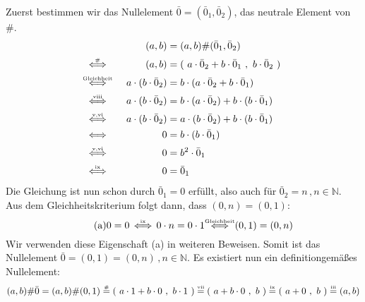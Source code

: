 \documentclass[a4paper,graphics,12pt]{article}
\newcommand{\up}[2]{\mathrel{\overset{\makebox[0pt]{\mbox{\normalfont\tiny #2}}}{#1}}}
\newcommand{\pair}[2]{(\ #1\ ,\ #2\ )}
\begin{document}
    Zuerst bestimmen wir das Nullelement $\bar{0} = (\bar{0}_1,\bar{0}_2)$, das neutrale Element von $\#$.
    \begin{alignat*}{3}
        &                                       & (a,b)
            &= (a,b) \# (\bar{0}_1,\bar{0}_2) \\[1pt]
        &\up{\Longleftrightarrow}{\#}\quad      & (a,b)
            &= \pair{a\cdot \bar{0}_2 + b\cdot \bar{0}_1}{b\cdot \bar{0}_2} \\[1pt]
        &\up{\Longleftrightarrow}{Gleichheit}   & a \cdot (b\cdot \bar{0}_2)
            &= b\cdot (a\cdot \bar{0}_2 + b\cdot \bar{0}_1) \\[1pt]
        &\up{\Longleftrightarrow}{viii}         & a\cdot (b\cdot \bar{0}_2)
            &= b\cdot (a\cdot \bar{0}_2) + b\cdot (b\cdot \bar{0}_1) \\[1pt]
        &\up{\Longleftrightarrow}{v,vi}         & a \cdot (b\cdot \bar{0}_2)
            &= a\cdot (b\cdot \bar{0}_2) + b\cdot (b\cdot \bar{0}_1) \\[1pt]
        &\up{\Longleftrightarrow}{}             & 0
            &= b\cdot (b\cdot \bar{0}_1) \\[1pt]
        &\up{\Longleftrightarrow}{v,vi}         & 0
            &= b^2\cdot \bar{0}_1 \\[1pt]
        &\up{\Longleftrightarrow}{ix}           & 0
            &= \bar{0}_1
    \end{alignat*}
    Die Gleichung ist nun schon durch $\bar{0}_1 = 0$ erfüllt,
    also auch für $\bar{0}_2 = n\,, n\in \mathbb{N}$.\\
    Aus dem Gleichheitskriterium folgt dann, dass $(0,n) = (0,1)$:
    \begin{equation}
        \tag{a}
        0 = 0 \up{\,\Longleftrightarrow\,}{ix} 0\cdot n = 0\cdot 1
        \up{\ \Longleftrightarrow\ }{Gleichheit} (0,1) = (0,n)
    \end{equation}
    Wir verwenden diese Eigenschaft (a) in weiteren Beweisen.
    Somit ist das Nullelement $\bar{0} = (0,1) = (0,n)\,,n \in \mathbb{N}$.
    Es existiert nun ein definitiongemäßes Nullelement:
    $$
        (a,b) \# \bar{0} = (a,b) \# (0,1) \up{=}{\#} \pair{a\cdot 1+ b\cdot0}{b\cdot 1}
        \up{=}{vii} \pair{a+b\cdot 0}{b} \up{=}{ix} \pair{a+0}{b} \up{=}{iii} (a,b)
    $$

\newpage
\end{document}
